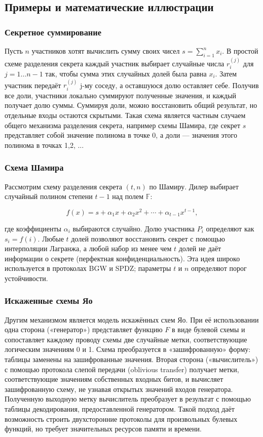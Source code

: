 \subsection{Примеры и математические иллюстрации}
\subsubsection{Секретное суммирование}
Пусть \(n\) участников хотят вычислить сумму своих чисел \(s=\sum_{i=1}^{n}x_{i}\). В простой схеме разделения секрета каждый участник выбирает случайные числа \(r_{i}^{(j)}\) для \(j=1\ldots n-1\) так, чтобы сумма этих случайных долей была равна \(x_{i}\). Затем участник передаёт \(r_{i}^{(j)}\) j-му соседу, а оставшуюся долю оставляет себе. Получив все доли, участники локально суммируют полученные значения, и каждый получает долю суммы. Суммируя доли, можно восстановить общий результат, но отдельные входы остаются скрытыми. Такая схема является частным случаем общего механизма разделения секрета, например схемы Шамира, где секрет \(s\) представляет собой значение полинома в точке 0, а доли --- значения этого полинома в точках 1,2, ...

\subsubsection{Схема Шамира}

Рассмотрим схему разделения секрета \((t,n)\) по Шамиру. Дилер выбирает случайный полином степени \(t-1\) над полем \(\mathbb{F}\):

\begin{equation}
f(x)=s+\alpha_{1}x+\alpha_{2}x^{2}+\cdots+\alpha_{t-1}x^{t-1},
\end{equation}

где коэффициенты \(\alpha_{i}\) выбираются случайно. Долю участника \(P_{i}\) определяют как \(s_{i}=f(i)\). Любые \(t\) долей позволяют восстановить секрет с помощью интерполяции Лагранжа, а любой набор из менее чем \(t\) долей не даёт информации о секрете (перфектная конфиденциальность). Эта идея широко используется в протоколах BGW и SPDZ; параметры \(t\) и \(n\) определяют порог устойчивости.

\subsubsection{Искаженные схемы Яо }

Другим механизмом является модель искажённых схем Яо. При её использовании одна сторона («генератор») представляет функцию \(F\) в виде булевой схемы и сопоставляет каждому проводу схемы две случайные метки, соответствующие логическим значениям 0 и 1. Схема преобразуется в «зашифрованную» форму: таблицы заменены на зашифрованные значения. Вторая сторона («вычислитель») с помощью протокола слепой передачи (oblivious transfer) получает метки, соответствующие значениям собственных входных битов, и вычисляет зашифрованную схему, не узнавая открытых значений входов генератора. Полученную выходную метку вычислитель преобразует в результат с помощью таблицы декодирования, предоставленной генератором. Такой подход даёт возможность строить двухсторонние протоколы для произвольных булевых функций, но требует значительных ресурсов памяти и времени.

